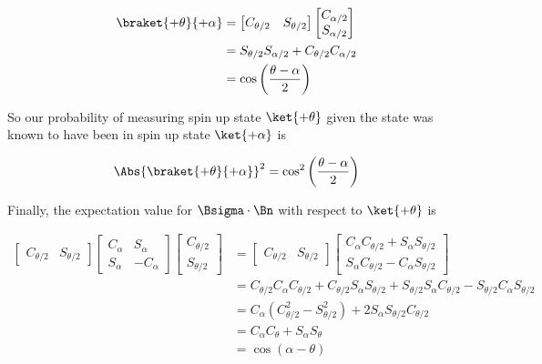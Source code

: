 \begin{align*}
\braket{+\theta}{+\alpha} 
&=
\begin{bmatrix}
C_{\theta/2} & S_{\theta/2} 
\end{bmatrix}
\begin{bmatrix}
C_{\alpha/2} \\ S_{\alpha/2} 
\end{bmatrix} \\
&=
S_{\theta/2} S_{\alpha/2} + C_{\theta/2} C_{\alpha/2}  \\
&= \cos\left( \frac{\theta - \alpha}{2} \right)
\end{align*}

So our probability of measuring spin up state $\ket{+\theta}$ given the state was known to have been in spin up state $\ket{+\alpha}$ is

\begin{align}\label{eqn:boostCommutator:508}
\Abs{ \braket{+\theta}{+\alpha} }^2 
= \cos^2\left( \frac{\theta - \alpha}{2} \right)
\end{align}

Finally, the expectation value for $\Bsigma \cdot \Bn$ with respect to $\ket{+\theta}$ is

\begin{align*}
\begin{bmatrix}
C_{\theta/2} & S_{\theta/2} 
\end{bmatrix}
\begin{bmatrix}
C_\alpha & S_\alpha \\
S_\alpha & -C_\alpha
\end{bmatrix}
\begin{bmatrix}
C_{\theta/2} \\
S_{\theta/2} 
\end{bmatrix} 
&=
\begin{bmatrix}
C_{\theta/2} & S_{\theta/2} 
\end{bmatrix}
\begin{bmatrix}
C_\alpha C_{\theta/2} + S_\alpha S_{\theta/2} \\
S_\alpha C_{\theta/2} - C_\alpha S_{\theta/2} 
\end{bmatrix} \\
&=
C_{\theta/2} C_\alpha C_{\theta/2} + C_{\theta/2} S_\alpha S_{\theta/2} 
+ S_{\theta/2} S_\alpha C_{\theta/2} - S_{\theta/2} C_\alpha S_{\theta/2} \\
&=
C_\alpha ( C_{\theta/2}^2 -S_{\theta/2}^2 )
+ 2 S_\alpha S_{\theta/2} C_{\theta/2} \\
&=
 C_\alpha C_\theta
+ S_\alpha S_\theta \\
&= \cos( \alpha - \theta )
\end{align*}

